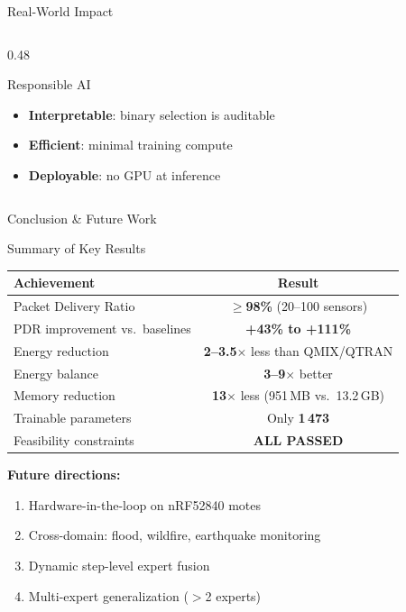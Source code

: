 \documentclass[aspectratio=169, 11pt]{beamer}
\begin{document}
\begin{frame}{Real-World Impact}
\begin{columns}[T]
\begin{column}{0.48\textwidth}
  \smallskip
  \begin{alertblock}{Responsible AI}
    \begin{itemize}\setlength{\itemsep}{1pt}
      \item \textbf{Interpretable}: binary selection is auditable
      \item \textbf{Efficient}: minimal training compute
      \item \textbf{Deployable}: no GPU at inference
    \end{itemize}
  \end{alertblock}

\end{column}
\end{columns}

\end{frame}

\begin{frame}{Conclusion \& Future Work}
\vspace{-4pt}
\begin{block}{Summary of Key Results}
\centering
\footnotesize
\renewcommand{\arraystretch}{1.1}
\begin{tabular}{lc}
  \toprule
  \textbf{Achievement} & \textbf{Result} \\
  \midrule
  Packet Delivery Ratio & $\geq$\textbf{98\%} (20--100 sensors) \\
  PDR improvement vs.\ baselines & \textbf{+43\% to +111\%} \\
  Energy reduction & \textbf{2--3.5$\times$} less than QMIX/QTRAN \\
  Energy balance & \textbf{3--9$\times$} better \\
  Memory reduction & \textbf{13$\times$} less (951\,MB vs.\ 13.2\,GB) \\
  Trainable parameters & Only \textbf{1\,473} \\
  Feasibility constraints & \textcolor{polygreen}{\textbf{ALL PASSED}} \\
  \bottomrule
\end{tabular}
\end{block}

\vspace{-2pt}
\smallskip
\textbf{Future directions:}
\begin{enumerate}\setlength{\itemsep}{1pt}
  \item Hardware-in-the-loop on nRF52840 motes
  \item Cross-domain: flood, wildfire, earthquake monitoring
  \item Dynamic step-level expert fusion
  \item Multi-expert generalization ($>$2 experts)
\end{enumerate}

\end{frame}
\end{document}
